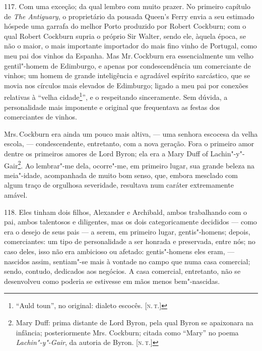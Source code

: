 117. Com uma exceção; da qual lembro com muito prazer. No primeiro
capítulo de \emph{The Antiguary}, o proprietário da pousada Queen's
Ferry envia a seu estimado hóspede uma garrafa do melhor Porto produzido
por Robert Cockburn; com o qual Robert Cockburn supria o próprio Sir
Walter, sendo ele, àquela época, se não o maior, o mais importante
importador do mais fino vinho de Portugal, como meu pai dos vinhos da
Espanha. Mas Mr.\,Cockburn era essencialmente um velho gentil"-homem de
Edimburgo, e apenas por condescendência um comerciante de vinhos; um
homem de grande inteligência e agradável espírito sarcástico, que se
movia nos círculos mais elevados de Edimburgo; ligado a meu pai por
conexões relativas à ``velha cidade\footnote{``Auld toun'', no original:
  dialeto escocês. {[}\textsc{n.\,t.}{]}}'', e o respeitando sinceramente. Sem
dúvida, a personalidade mais imponente e original que frequentava as
festas dos comerciantes de vinhos.

Mrs.\,Cockburn era ainda um pouco mais altiva, --- uma senhora escocesa da
velha escola, --- condescendente, entretanto, com a nova geração. Fora o
primeiro amor dentre os primeiros amores de Lord Byron; ela era a Mary
Duff of Lachin"-y"-Gair\footnote{Mary Duff: prima distante de Lord Byron,
  pela qual Byron se apaixonara na infância; posteriormente Mrs.
  Cockburn; citada como ``Mary'' no poema \emph{Lachin"-y"-Gair}, da
  autoria de Byron. {[}\textsc{n.\,t.}{]}}. Ao lembrar"-me dela, ocorre"-me, em
primeiro lugar, sua grande beleza na meia"-idade, acompanhada de muito
bom senso, que, embora mesclado com algum traço de orgulhosa severidade,
resultava num caráter extremamente amável.

118. Eles tinham dois filhos, Alexander e Archibald, ambos trabalhando
com o pai, ambos talentosos e diligentes, mas os dois categoricamente
decididos --- como era o desejo de seus pais --- a serem, em primeiro
lugar, gentis"-homens; depois, comerciantes: um tipo de personalidade a
ser honrada e preservada, entre nós; no caso deles, isso não era
ambicioso ou afetado: gentis"-homens eles eram, --- nascidos assim,
sentiam"-se mais à vontade no campo que numa casa comercial; sendo,
contudo, dedicados aos negócios. A casa comercial, entretanto, não se
desenvolveu como poderia se estivesse em mãos menos bem"-nascidas.

